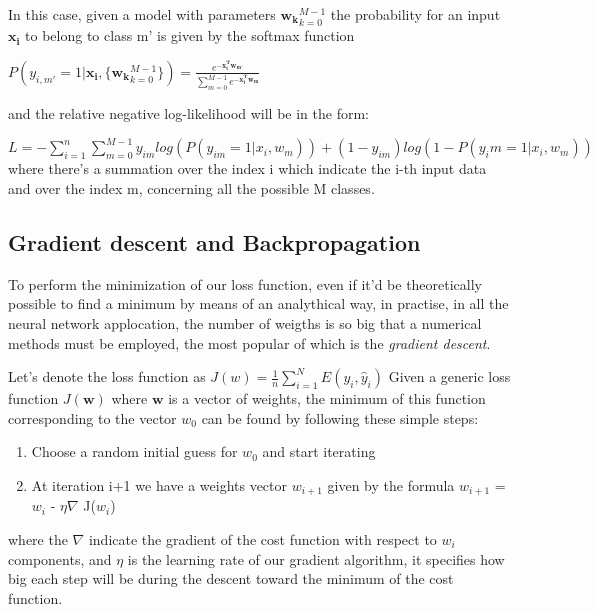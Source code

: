 \documentclass[a4paper,11pt]{article}
\begin{document}
In this case, given a model with parameters $\mathbf{w_k}_{k=0}^{M-1}$ the probability for an input $\mathbf{x_i}$ to belong to class m' is given by the softmax function

$P(y_{i,m'}= 1 | \mathbf{x_i}, \{\mathbf{w_k}_{k=0}^{M-1}\} ) = \frac{e^{-\mathbf{x_i^T w_{m'}}} }{\sum_{m = 0}^{M-1} e^{-\mathbf{x_i^T w_{m}}}}$

and the relative negative log-likelihood will be in the form:

$L = -\sum_{i=1}^{n} \sum_{m= 0}^{M-1} y_{im} log(P(y_{im}=1|x_i, w_m)) + (1-y_{im})log(1-P(y_im=1|x_i, w_m))  $
where there's a summation over the index i which indicate the i-th input data and over the index m, concerning all the possible M classes.

\subsection{Gradient descent and Backpropagation}

To perform the minimization of our loss function, even if it'd be theoretically possible to find a minimum by means of an analythical way, in practise, in all the neural network applocation, the number of weigths is so big that a numerical methods must be employed, the most popular of which is the \emph{gradient descent}.

Let's denote the loss function as $J(w) = \frac{1}{n}\sum_{i = 1}^N E(y_i, \hat y_i)$
Given a generic loss function $J(\textbf{w})$ where $\textbf{w}$ is a vector of weights, the minimum of this function corresponding to the vector $w_0$ can be found by following these simple steps:

\begin{enumerate}
\item Choose a random initial guess for \textbf{$w_0$} and start iterating
\item At iteration i+1 we have a weights vector \textbf{$w_{i+1}$} given by the formula \textbf{$w_{i+1}$} = \textbf{$w_i$} - $\eta \nabla$ J(\textbf{$w_i$})
\end{enumerate}

 where the $\nabla$ indicate the gradient of the cost function with respect to \textbf{$w_i$} components, and $\eta$ is the learning rate of our gradient algorithm, it specifies how big each step will be during the descent toward the minimum of the cost function.

\end{document}
